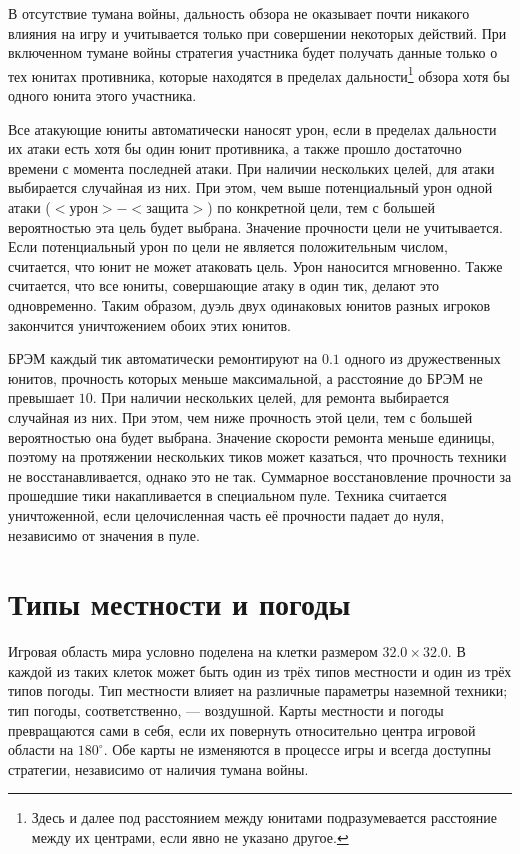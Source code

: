 В отсутствие тумана войны, дальность обзора не оказывает почти никакого влияния на игру и учитывается только при совершении некоторых
действий. При включенном тумане войны стратегия участника будет получать данные только о тех юнитах противника, которые находятся в пределах
дальности\footnote[2]{Здесь и далее под расстоянием между юнитами подразумевается расстояние между их центрами, если явно не указано
другое.} обзора хотя бы одного юнита этого участника.

Все атакующие юниты автоматически наносят урон, если в пределах дальности их атаки есть хотя бы один юнит противника, а также прошло
достаточно времени с момента последней атаки. При наличии нескольких целей, для атаки выбирается случайная из них. При этом, чем выше
потенциальный урон одной атаки ($<урон>-<защита>$) по конкретной цели, тем с большей вероятностью эта цель будет выбрана. Значение
прочности цели не учитывается. Если потенциальный урон по цели не является положительным числом, считается, что юнит не может атаковать
цель. Урон наносится мгновенно. Также считается, что все юниты, совершающие атаку в один тик, делают это одновременно. Таким образом, дуэль
двух одинаковых юнитов разных игроков закончится уничтожением обоих этих юнитов.

БРЭМ каждый тик автоматически ремонтируют на $0.1$ одного из дружественных юнитов, прочность которых меньше максимальной, а расстояние до
БРЭМ не превышает $10$. При наличии нескольких целей, для ремонта выбирается случайная из них. При этом, чем ниже прочность этой цели, тем с
большей вероятностью она будет выбрана. Значение скорости ремонта меньше единицы, поэтому на протяжении нескольких тиков может казаться, что
прочность техники не восстанавливается, однако это не так. Суммарное восстановление прочности за прошедшие тики накапливается в специальном
пуле. Техника считается уничтоженной, если целочисленная часть её прочности падает до нуля, независимо от значения в пуле.

\section{Типы местности и погоды}

Игровая область мира условно поделена на клетки размером $32.0\times32.0$. В каждой из таких клеток может быть один из трёх типов местности
и один из трёх типов погоды. Тип местности влияет на различные параметры наземной техники; тип погоды, соответственно, --- воздушной. Карты
местности и погоды превращаются сами в себя, если их повернуть относительно центра игровой области на $180^\circ$. Обе карты не изменяются в
процессе игры и всегда доступны стратегии, независимо от наличия тумана войны.

